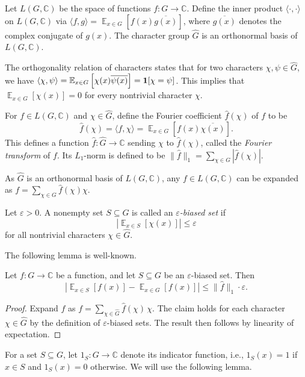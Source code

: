 \documentclass[11pt]{article}
\newcommand{\eps}{\varepsilon}
\newcommand{\ex}{\mathop{{}\mathbb{E}}}
\newcommand{\C}{\mathbb{C}}
\begin{document}
Let $L(G,\C)$ be the space of functions $f:G\to \C$.
Define the
inner product $\langle\cdot,\cdot\rangle$ on $L(G,\C)$ via $\langle f,g\rangle=\ex_{x\in G} \left[f(x)\overline{g(x)}\right]$, where $\overline{g(x)}$ denotes the complex conjugate of $g(x)$. The character group $\widehat{G}$ is an orthonormal basis of $L(G,\C)$. 

The orthogonality relation of characters states that for two characters $\chi,\psi\in\widehat{G}$, we have $\langle \chi,\psi\rangle=\ex_{x\in G} \left[\chi(x)\overline{\psi(x)}\right]={\bf 1}[\chi=\psi]$. This implies that $\ex_{x\in G} \left[\chi(x)\right]=0$ for every nontrivial character $\chi$.

For $f\in L(G,\C)$ and $\chi \in \widehat{G}$, define the Fourier coefficient $\widehat{f}(\chi)$ of $f$ to be
\[
\widehat{f}(\chi)=\langle f,\chi\rangle=\ex_{x\in G} \left[f(x)\overline{\chi(x)}\right].
\]
This defines a function $\widehat{f}: \widehat{G} \to \C$ sending $\chi$ to $\widehat{f}(\chi)$, called the \emph{Fourier transform} of $f$. Its $L_1$-norm is defined to be $\|\widehat{f}\|_1=\sum_{\chi\in \widehat{G}} |\widehat{f}(\chi)|$. 

As $\widehat{G}$ is an orthonormal basis of $L(G,\C)$, any $f\in L(G,\C)$ can be expanded as 
$f=\sum_{\chi\in G} \widehat{f}(\chi) \chi$.

\begin{definition}[$\eps$-biased set]\label{def:eps-biased-set}
Let $\eps>0$. A nonempty set $S\subseteq G$ is called an \emph{$\eps$-biased set} if 
\[
\left|\ex_{x\in S}[\chi(x)]\right|\leq \eps
\]
for all nontrivial characters $\chi\in \widehat{G}$.
\end{definition}

The following lemma is well-known.
\begin{lemma}\label{lem:epsfool}
Let $f: G\to \C$ be a function, and let $S\subseteq G$ be an $\eps$-biased set. Then
\[
\left|\ex_{x\in S}[f(x)] - \ex_{x\in G}[f(x)]\right|\leq \|\widehat{f}\|_1 \cdot \eps.
\]
\end{lemma}
\begin{proof}
Expand $f$ as $f=\sum_{\chi\in \widehat{G}} \widehat{f}(\chi)\,\chi$. The claim holds for each character $\chi\in \widehat{G}$ by the definition of $\eps$-biased sets. The result then follows by linearity of expectation.
\end{proof}

For a set $S\subseteq G$, let $1_S: G\to \C$ denote its indicator function, i.e., $1_S(x)=1$ if $x\in S$ and $1_S(x)=0$ otherwise. We will use the following lemma.
\end{document}
